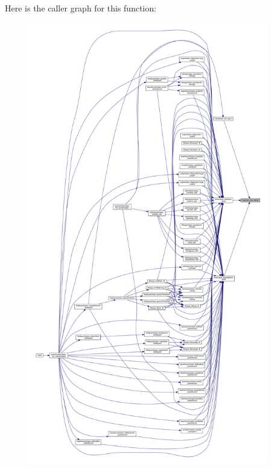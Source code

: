 Here is the caller graph for this function\+:
\nopagebreak
\begin{figure}[H]
\begin{center}
\leavevmode
\includegraphics[height=550pt]{namespacempistub_a2456432a60801629e19273ebe4114bc9_icgraph}
\end{center}
\end{figure}
